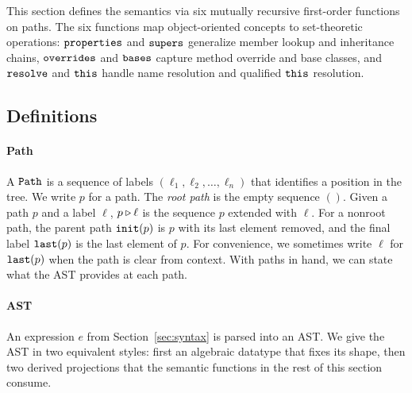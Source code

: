 This section defines the semantics via six mutually recursive
first-order functions on paths.
The six functions map object-oriented concepts to
set-theoretic operations: $\mathtt{properties}$ and $\mathtt{supers}$
generalize member lookup and inheritance chains,
$\mathtt{overrides}$ and $\mathtt{bases}$ capture method override and
base classes, and $\mathtt{resolve}$ and $\mathtt{this}$ handle name
resolution and qualified $\mathtt{this}$ resolution.

\subsection{Definitions}
\label{sec:definitions}

\paragraph{Path}
A $\mathtt{Path}$ is a sequence of labels
$(\ell_1, \ell_2, \ldots, \ell_n)$ that identifies a position in
the tree.
We write $p$ for a path.
The \emph{root path} is the empty sequence $()$.
Given a path $p$ and a label $\ell$,
$p \mathbin{\triangleright} \ell$ is the sequence $p$ extended with $\ell$.
For a nonroot path, the parent path $\mathtt{init}(p)$ is $p$ with
its last element removed,
and the final label $\mathtt{last}(p)$ is the last element of $p$.
For convenience, we sometimes write $\ell$ for $\mathtt{last}(p)$
when the path is clear from context.
With paths in hand, we can state what the AST provides
at each path.

\paragraph{AST}
An expression $e$ from Section~\ref{sec:syntax} is parsed into an AST.
We give the AST in two equivalent styles: first an algebraic
datatype that fixes its shape, then two derived projections that
the semantic functions in the rest of this section consume.

